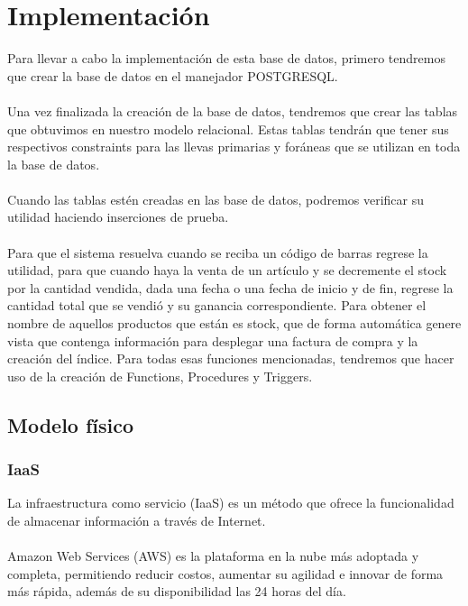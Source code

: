 \documentclass[12pt,letterpaper]{article}
\begin{document}
	\section{Implementación}
	Para llevar a cabo la implementación de esta base de datos, primero tendremos que crear la base de datos en el manejador POSTGRESQL.\\
	\\Una vez finalizada la creación de la base de datos, tendremos que crear las tablas que obtuvimos en nuestro modelo relacional. Estas tablas tendrán que tener sus respectivos constraints para las llevas primarias y foráneas que se utilizan en toda la base de datos.\\
	\\Cuando las tablas estén creadas en las base de datos, podremos verificar su utilidad haciendo inserciones de prueba. \\
	\\Para que el sistema resuelva cuando se reciba un código de barras regrese la utilidad, para que cuando haya la venta de un artículo y se decremente el stock por la cantidad vendida, dada una fecha o una fecha de inicio y de fin, regrese la cantidad total que se vendió y su ganancia correspondiente.  Para obtener el nombre de aquellos productos que están es stock, que de forma automática genere vista que contenga información para desplegar una factura de compra y la creación del índice. Para todas esas funciones mencionadas, tendremos que hacer uso de la creación de Functions, Procedures y Triggers. 
	
	\subsection{Modelo físico}
	
	\subsubsection{IaaS}
	La infraestructura como servicio (IaaS) es un método que ofrece la funcionalidad de almacenar información a través de Internet.\\
	\\Amazon Web Services (AWS) es la plataforma en la nube más adoptada y completa, permitiendo reducir costos, aumentar su agilidad e innovar de forma más rápida, además de su disponibilidad las 24 horas del día.\\
	
\end{document}
